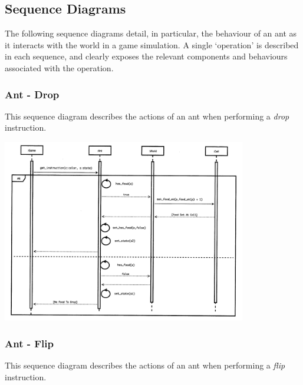 \documentclass[11pt]{article}
\begin{document}
\subsection{Sequence Diagrams}

The following sequence diagrams detail, in particular, the behaviour of an ant as it interacts with the world in a game simulation. A single `operation' is described in each sequence, and clearly exposes the relevant components and behaviours associated with the operation. 

\subsubsection{Ant - Drop}

This sequence diagram describes the actions of an ant when performing a \textit{drop} instruction.

\begin{center}
\includegraphics[width=0.8\textwidth]{low-level-diagrams/sequence/ant-drop.png}
\end{center}

\subsubsection{Ant - Flip}

This sequence diagram describes the actions of an ant when performing a \textit{flip} instruction.
\end{document}
